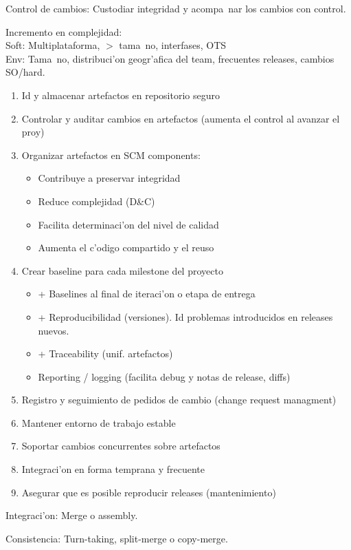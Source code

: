 \documentclass[a4paper,spanish]{article}
\newcommand{\tab}[0]{\hspace*{0.5cm}}
\newenvironment{items}{
		\vspace*{-\topsep}
		\begin{itemize} 
		\addtolength{\itemsep}{-0.5\baselineskip}
		}{\end{itemize}\vspace*{-\topsep}}
\newenvironment{numbers}{
		\vspace*{-\topsep}
		\begin{enumerate} 
		\addtolength{\itemsep}{-0.5\baselineskip}
		}{\end{enumerate}\vspace*{-\topsep}}
\begin{document}
Control de cambios: Custodiar integridad y acompa~nar los cambios con control.

Incremento en complejidad: \\
\tab Soft: Multiplataforma, $>$ tama~no, interfases, OTS \\
\tab Env: Tama~no, distribuci'on geogr'afica del team, frecuentes releases,
	cambios SO/hard.
	
\begin{numbers}
\item Id y almacenar artefactos en repositorio seguro
\item Controlar y auditar cambios en artefactos (aumenta el control al 
	avanzar el proy)
\item Organizar artefactos en SCM components:
	\begin{items}
	\item Contribuye a preservar integridad
	\item Reduce complejidad (D\&C)
	\item Facilita determinaci'on del nivel de calidad
	\item Aumenta el c'odigo compartido y el reuso
	\end{items}
\item Crear baseline para cada milestone del proyecto
	\begin{items}
	\item + Baselines al final de iteraci'on o etapa de entrega
	\item + Reproducibilidad (versiones). Id problemas introducidos en 
		releases nuevos.
	\item + Traceability (unif. artefactos)
	\item Reporting / logging (facilita debug y notas de release, diffs)
	\end{items}
\item Registro y seguimiento de pedidos de cambio (change request managment)
\item Mantener entorno de trabajo estable
\item Soportar cambios concurrentes sobre artefactos
\item Integraci'on en forma temprana y frecuente
\item Asegurar que es posible reproducir releases (mantenimiento)
\end{numbers}

Integraci'on: Merge o assembly.

Consistencia: Turn-taking, split-merge o copy-merge.
\end{document}
